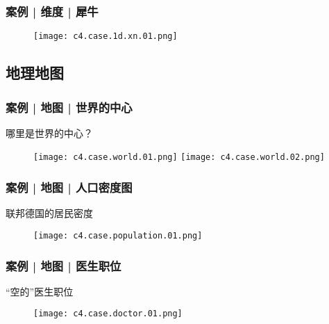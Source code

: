 \begin{frame}
  \frametitle{案例 | 维度 | 犀牛}
  \begin{figure}
    \centering
    \texttt{[image: c4.case.1d.xn.01.png]}
  \end{figure}
\end{frame}

\subsection{地理地图}
\begin{frame}
  \frametitle{案例 | 地图 | 世界的中心}
  \begin{block}{哪里是世界的中心？}
    \begin{figure}
      \centering
      \texttt{[image: c4.case.world.01.png]}\quad
      \texttt{[image: c4.case.world.02.png]}
    \end{figure}
  \end{block}
\end{frame}

\begin{frame}
  \frametitle{案例 | 地图 | 人口密度图}
  \begin{block}{联邦德国的居民密度}
    \begin{figure}
      \centering
      \texttt{[image: c4.case.population.01.png]}
    \end{figure}
  \end{block}
\end{frame}

\begin{frame}
  \frametitle{案例 | 地图 | 医生职位}
  \begin{block}{“空的”医生职位}
    \begin{figure}
      \centering
      \texttt{[image: c4.case.doctor.01.png]}
    \end{figure}
  \end{block}
\end{frame}


